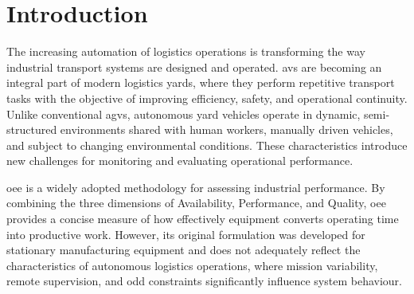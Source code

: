 \documentclass[12pt,a4paper]{report}
\begin{document}
\cleardoublepage
\tableofcontents

\cleardoublepage
\listoffigures

\cleardoublepage
\listoftables

\glsaddall
\printacronyms[title={List of Acronyms},toctitle={List of Acronyms}]




\cleardoublepage
{} %
\setcounter{page}{1}   %
\pagestyle{fancy}      %
\fancyhead{} %
\fancyhead[L]{\MakeUppercase{\leftmark}} %

\renewcommand{\chaptermark}[1]{%
\markboth{CHAPTER \thechapter. #1}{}%
}

\chapter*{Introduction}

The increasing automation of logistics operations is transforming the way industrial transport
systems are designed and operated. \glspl{av} are becoming an integral part
of modern logistics yards, where they perform repetitive transport tasks with the objective
of improving efficiency, safety, and operational continuity. Unlike conventional
\glspl{agv}, autonomous yard vehicles
operate in dynamic, semi-structured environments shared with human workers, manually driven
vehicles, and subject to changing environmental conditions. These characteristics introduce new
challenges for monitoring and evaluating operational performance.

\gls{oee} is a widely adopted methodology for assessing industrial
performance. By combining the three dimensions of Availability, Performance, and Quality,
\gls{oee} provides a concise measure of how effectively equipment converts operating time
into productive work. However, its original formulation was developed for stationary
manufacturing equipment and does not adequately reflect the characteristics of autonomous logistics
operations, where mission variability, remote supervision, and \gls{odd} constraints
significantly influence system behaviour.
\end{document}
